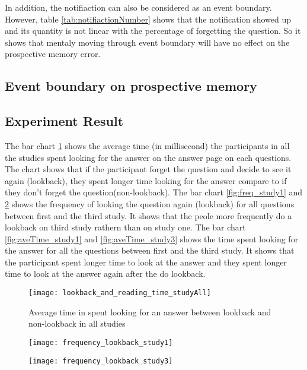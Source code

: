 In addition, the notifiaction can also be considered as an event boundary. However, table \ref{tab:notifiactionNumber} shows
that the notification showed up and its quantity is not linear with the percentage of forgetting the question.
So it shows that mentaly moving through event boundary will have no effect on the prospective memory error.

\subsection{Event boundary on prospective memory}
\subsection{Experiment Result}
The bar chart \ref{fig:lookingAnswer_lookback} shows the average time (in millisecond) the participants in all the studies spent looking for the answer on the answer page on each questions.
The chart shows that if the participant forget the question and decide to see it again (lookback), they spent longer time looking for the answer compare to if they don't forget the question(non-lookback).
The bar chart \ref{fig:freq_study1} and \ref{fig:freq_study3} shows the frequency of looking the question again (lookback) for all questions  between first and the third study.
It shows that the peole more frequently do a lookback on third study rathern than on study one.
The bar chart \ref{fig:aveTime_study1} and \ref{fig:aveTime_study3} shows the time spent looking for the answer for all the questions between first and the third study.
It shows that the participant spent longer time to look at the answer and they spent longer time to look at the answer again after the do lookback.
\begin{figure}[!h]
\begin{center}
\texttt{[image: lookback\_and\_reading\_time\_studyAll]}
\end{center}
\captionsetup{justification=centering}
\caption{Average time in spent looking for an answer between lookback and non-lookback in all studies}
\label{fig:lookingAnswer_lookback}
\end{figure}

\begin{figure}[!h]
\centering
\begin{minipage}{.5\textwidth}
  \centering
  \texttt{[image: frequency\_lookback\_study1]}
  \captionsetup{justification=centering}
  \label{fig:freq_study1}
\end{minipage}%
\begin{minipage}{.5\textwidth}
  \centering
  \texttt{[image: frequency\_lookback\_study3]}
  \captionsetup{justification=centering}
  \label{fig:freq_study3}
\end{minipage}
\end{figure}

